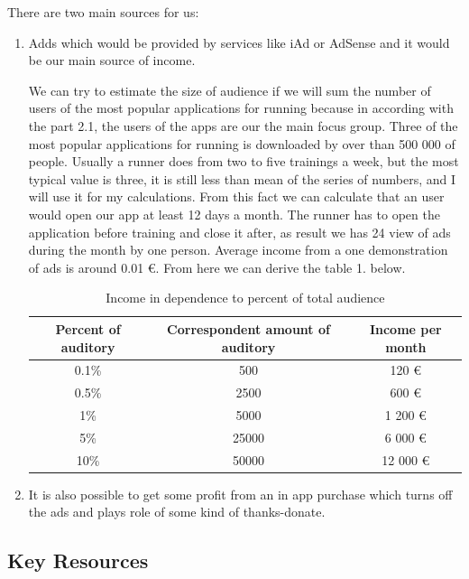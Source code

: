 \documentclass[english]{article}
\begin{document}
There are two main sources for us:
\begin{enumerate}

  \item Adds which would be provided by services like iAd or AdSense and it would be our main source of income.

We can try to estimate the size of audience if we will sum the number of users of the most popular applications for running because in according with the part 2.1, the users of the apps are our the main focus group.
Three of the most popular applications for running is downloaded by over than 500 000 of people. Usually a runner does from two to five trainings a week, but the most typical value is three, it is still less than mean of the series of numbers, and I will use it for my calculations. From this fact we can calculate that an user would open our app at least 12 days a month. The runner has to open the application before training and close it after, as result we has 24 view of ads during the month by one person. Average income from a one demonstration of ads is around 0.01 \euro . From here we can derive the table 1. below.	

\begin{table}[h]
 \begin{center}
  \caption{Income in dependence to percent of total audience }
    \begin{tabular}{ c c c }    
    	\hline
  	  Percent of auditory & Correspondent amount of auditory & Income per month  \\ \hline
  	   0.1\% & 500 & 120 \euro \\  
  	   0.5\% & 2500 & 600 \euro \\  
		1\% & 5000 & 1 200 \euro \\    
 	   5\% & 25000 & 6 000 \euro \\
 	   10\% & 50000 & 12 000 \euro \\
  	  \hline
    \end{tabular}
 \end{center}
\end{table}

  \item It is also possible to get some profit from an in app purchase which turns off the ads and plays role of some kind of thanks-donate. 


\end{enumerate}

\subsection{Key Resources}
\end{document}

